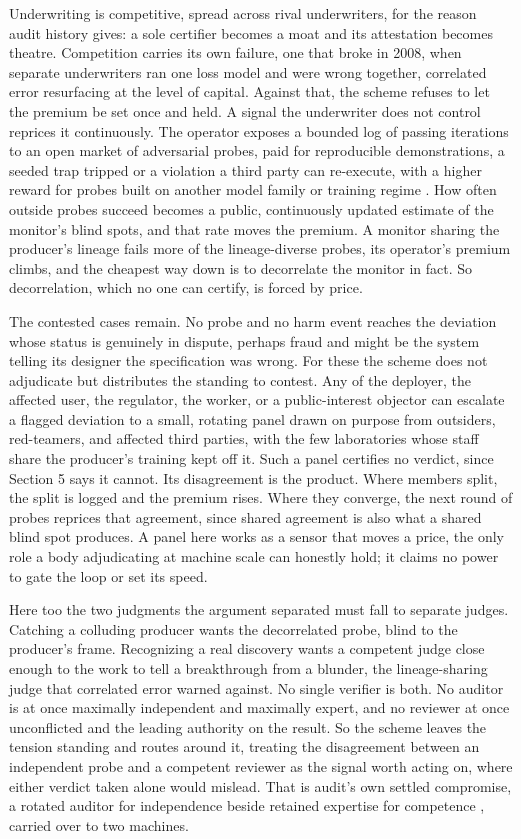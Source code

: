 \documentclass[11pt]{article}
\begin{document}
Underwriting is competitive, spread across rival underwriters, for the reason audit history gives: a sole certifier becomes a moat and its attestation becomes theatre. Competition carries its own failure, one that broke in 2008, when separate underwriters ran one loss model and were wrong together, correlated error resurfacing at the level of capital. Against that, the scheme refuses to let the premium be set once and held. A signal the underwriter does not control reprices it continuously. The operator exposes a bounded log of passing iterations to an open market of adversarial probes, paid for reproducible demonstrations, a seeded trap tripped or a violation a third party can re-execute, with a higher reward for probes built on another model family or training regime \citep{kenway2022}. How often outside probes succeed becomes a public, continuously updated estimate of the monitor's blind spots, and that rate moves the premium. A monitor sharing the producer's lineage fails more of the lineage-diverse probes, its operator's premium climbs, and the cheapest way down is to decorrelate the monitor in fact. So decorrelation, which no one can certify, is forced by price.

The contested cases remain. No probe and no harm event reaches the deviation whose status is genuinely in dispute, perhaps fraud and might be the system telling its designer the specification was wrong. For these the scheme does not adjudicate but distributes the standing to contest. Any of the deployer, the affected user, the regulator, the worker, or a public-interest objector can escalate a flagged deviation to a small, rotating panel drawn on purpose from outsiders, red-teamers, and affected third parties, with the few laboratories whose staff share the producer's training kept off it. Such a panel certifies no verdict, since Section 5 says it cannot. Its disagreement is the product. Where members split, the split is logged and the premium rises. Where they converge, the next round of probes reprices that agreement, since shared agreement is also what a shared blind spot produces. A panel here works as a sensor that moves a price, the only role a body adjudicating at machine scale can honestly hold; it claims no power to gate the loop or set its speed.

Here too the two judgments the argument separated must fall to separate judges. Catching a colluding producer wants the decorrelated probe, blind to the producer's frame. Recognizing a real discovery wants a competent judge close enough to the work to tell a breakthrough from a blunder, the lineage-sharing judge that correlated error warned against. No single verifier is both. No auditor is at once maximally independent and maximally expert, and no reviewer at once unconflicted and the leading authority on the result. So the scheme leaves the tension standing and routes around it, treating the disagreement between an independent probe and a competent reviewer as the signal worth acting on, where either verdict taken alone would mislead. That is audit's own settled compromise, a rotated auditor for independence beside retained expertise for competence \citep{power1997}, carried over to two machines.
\end{document}
